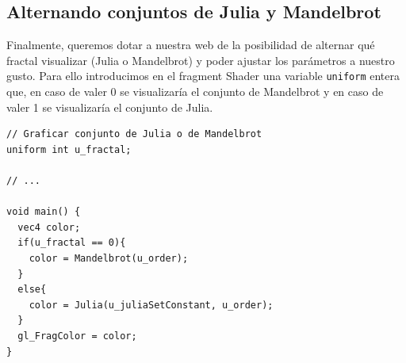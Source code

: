 \subsection{Alternando conjuntos de Julia y Mandelbrot}
\label{subsection:alternando}

Finalmente, queremos dotar a nuestra web de la posibilidad de alternar qué fractal visualizar (Julia o Mandelbrot) y poder ajustar los parámetros a nuestro gusto. Para ello introducimos en el fragment Shader una variable \verb|uniform| entera que, en caso de valer 0 se visualizaría el conjunto de Mandelbrot y en caso de valer 1 se visualizaría el conjunto de Julia.

\begin{lstlisting}
// Graficar conjunto de Julia o de Mandelbrot
uniform int u_fractal;

// ... 

void main() {
  vec4 color;
  if(u_fractal == 0){
    color = Mandelbrot(u_order);
  }
  else{
    color = Julia(u_juliaSetConstant, u_order);
  }
  gl_FragColor = color;
}
\end{lstlisting}